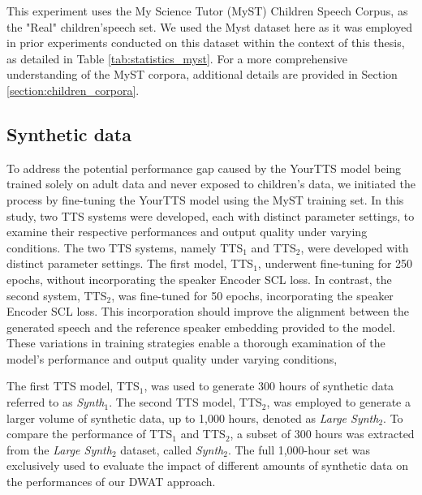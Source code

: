 This experiment uses the My Science Tutor (MyST) Children Speech Corpus, as the "Real" children'speech set. We used the Myst dataset here as it was employed in prior experiments conducted on this dataset within the context of this thesis, as detailed in Table \ref{tab:statistics_myst}. For a more comprehensive understanding of the MyST corpora, additional details are provided in Section \ref{section:children_corpora}.


\subsection{Synthetic data}
To address the potential performance gap caused by the YourTTS model being trained solely on adult data and never exposed to children's data, we initiated the process by fine-tuning the YourTTS model using the MyST training set. In this study, two \ac{TTS} systems were developed, each with distinct parameter settings, to examine their respective performances and output quality under varying conditions. The two \ac{TTS} systems, namely TTS$_1$ and TTS$_2$, were developed with distinct parameter settings. The first model, TTS$_1$, underwent fine-tuning for 250 epochs, without incorporating the speaker Encoder \ac{SCL} loss. In contrast, the second system, TTS$_2$, was fine-tuned for 50 epochs, incorporating the speaker Encoder \ac{SCL} loss. This incorporation should improve the alignment between the generated speech and the reference speaker embedding provided to the model. These variations in training strategies enable a thorough examination of the model's performance and output quality under varying conditions,

The first \ac{TTS} model, TTS$_1$, was used to generate 300 hours of synthetic data referred to as \textit{Synth$_1$}. The second \ac{TTS} model, TTS$_2$, was employed to generate a larger volume of synthetic data, up to 1,000 hours, denoted as \textit{Large Synth$_2 $}. To compare the performance of TTS$_1$ and TTS$_2$, a subset of 300 hours was extracted from the \textit{Large Synth$_2$} dataset, called \textit{Synth$_2$}. The full 1,000-hour set was exclusively used to evaluate the impact of different amounts of synthetic data on the performances of our \ac{DWAT} approach.

